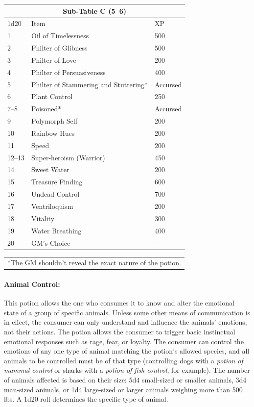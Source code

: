 \begin{multicols}{2}
\noindent
\begin{tabular}{|p{}|p{}|p{}|}
\multicolumn{3}{c}{Sub-Table C (5--6)} \\
\hline
1d20	& Item	& XP \\
\hline\hline
\rowcolor[gray]{.9}1	& Oil of Timelessness	& 500 \\
2	& Philter of Glibness	& 500 \\
\rowcolor[gray]{.9}3	& Philter of Love	& 200 \\
4	& Philter of Persuasiveness	& 400 \\
\rowcolor[gray]{.9}5	& Philter of Stammering and Stuttering*	& Accursed \\
6	& Plant Control	& 250 \\
\rowcolor[gray]{.9}7--8	& Poisoned*	& Accursed \\
9	& Polymorph Self	& 200 \\
\rowcolor[gray]{.9}10	& Rainbow Hues	& 200 \\
11	& Speed	& 200 \\
\rowcolor[gray]{.9}12--13	& Super-heroism (Warrior)	& 450 \\
14	& Sweet Water	& 200 \\
\rowcolor[gray]{.9}15	& Treasure Finding	& 600 \\
16	& Undead Control	& 700 \\
\rowcolor[gray]{.9}17	& Ventriloquism	& 200 \\
18	& Vitality	& 300 \\
\rowcolor[gray]{.9}19	& Water Breathing	& 400 \\
20	& GM's Choice	& -- \\
\hline
\end{tabular}
\noindent\begin{tabular}{p{}}
*The GM shouldn't reveal the exact nature of the potion. \\
\end{tabular}\vspace{.5em}

\paragraph{Animal Control:} This potion allows the one who consumes it to know and alter the emotional state of a group of specific animals.  Unless some other means of communication is in effect, the consumer can only understand and influence the animals' emotions, not their actions.  The potion allows the consumer to trigger basic instinctual emotional responses such as rage, fear, or loyalty.  The consumer can control the emotions of any one type of animal matching the potion's allowed species, and all animals to be controlled must be of that type (controlling dogs with a \textit{potion of mammal control} or sharks with a \textit{potion of fish control}, for example).  The number of animals affected is based on their size: 5d4 small-sized or smaller animals, 3d4 man-sized animals, or 1d4 large-sized or larger animals weighing more than 500 lbs.  A 1d20 roll determines the specific type of animal.


\end{multicols}
